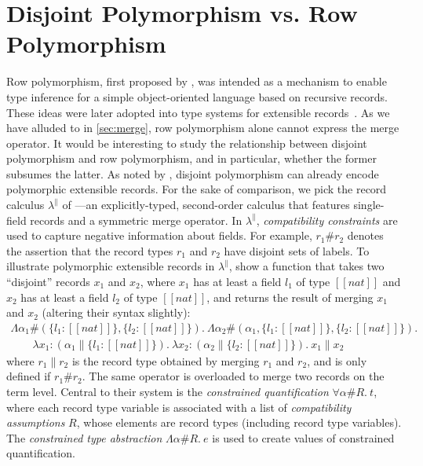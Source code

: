 \section{Disjoint Polymorphism vs. Row Polymorphism}

Row polymorphism, first proposed by \citet{wand1987complete}, was intended as a
mechanism to enable type inference for a simple object-oriented language based
on recursive records. These ideas were later adopted into type systems for
extensible records~\citep{Harper:1991:RCB:99583.99603, gaster1996polymorphic}.
As we have alluded to in \cref{sec:merge}, row polymorphism alone cannot express
the merge operator. It would be interesting to study the
relationship between disjoint polymorphism and row polymorphism, and in
particular, whether the former subsumes the latter. As noted by
\citet{alpuimdisjoint}, disjoint polymorphism can already encode polymorphic
extensible records. For the sake of comparison, we pick the record calculus
$\lambda^{\|}$ of \citet{Harper:1991:RCB:99583.99603}---an explicitly-typed,
second-order calculus that features single-field records and a symmetric merge
operator. In $\lambda^{\|}$, \textit{compatibility constraints} are used to
capture negative information about fields. For example, $r_1 \# r_2 $ denotes the
assertion that the record types $r_1$ and $r_2$ have disjoint sets of labels. To
illustrate polymorphic extensible records in $\lambda^{\|}$,
\citeauthor{Harper:1991:RCB:99583.99603} show a function that takes two
``disjoint'' records $x_1$ and $x_2$, where $x_1$ has at least a field $l_1$ of
type $[[nat]]$ and $x_2$ has at least a field $l_2$ of type $[[nat]]$, and
returns the result of merging $x_1$ and $x_2$ (altering their syntax slightly):
\begin{align*}
  \Lambda \alpha_1 \# (\{ l_1 : [[nat]] \}, \{ l_2 : [[nat]] \}) .\  \Lambda \alpha_2 \# (\alpha_1 , \{l_1 : [[nat]]\} , \{ l_2 : [[nat]]   \}) . \\
  \qquad \lambda x_1 : (\alpha_1 \| \{ l_1 : [[nat]] \}) .\  \lambda x_2 : (\alpha_2 \| \{ l_2 : [[nat]] \}) .\ x_1 \| x_2
\end{align*}
where $r_1 \| r_2$ is the record type obtained by merging $r_1$ and $r_2$, and
is only defined if $r_1 \# r_2$. The same operator is overloaded to merge two
records on the term level. Central to their system is the \textit{constrained
  quantification} $\forall \alpha \# R .\ t $, where each record type variable is
associated with a list of \textit{compatibility assumptions} $R$, whose elements
are record types (including record type variables). The \textit{constrained type abstraction} $\Lambda \alpha \# R.\ e$
is used to create values of constrained quantification.



